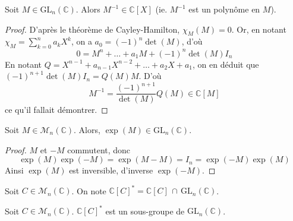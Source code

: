 





  \begin{lemma}
    \label{surjectivite-de-l-exponentielle-1}
    Soit $M \in \mathrm{GL}_n(\mathbb{C})$. Alors $M^{-1} \in \mathbb{C}[X]$ (ie. $M^{-1}$ est un polynôme en $M$).
  \end{lemma}

  \begin{proof}
    D'après le théorème de Cayley-Hamilton, $\chi_M(M) = 0$. Or, en notant $\chi_M = \sum_{k=0}^n a_k X^k$, on a $a_0 = (-1)^n \det(M)$, d'où
    \[ 0 = M^n + \dots + a_1 M + (-1)^n \det(M) I_n \]
    En notant $Q = X^{n-1} + a_{n-1}X^{n-2} + \dots + a_2 X + a_1$, on en déduit que $(-1)^{n+1} \det(M) I_n = Q(M)M$. D'où
    \[ M^{-1} = \frac{(-1)^{n+1}}{\det(M)} Q(M) \in \mathbb{C}[M] \]
    ce qu'il fallait démontrer.
  \end{proof}

  \begin{lemma}
    \label{surjectivite-de-l-exponentielle-2}
    Soit $M \in \mathcal{M}_n(\mathbb{C})$. Alors, $\exp(M) \in \mathrm{GL}_n(\mathbb{C})$.
  \end{lemma}

  \begin{proof}
    $M$ et $-M$ commutent, donc
    \[ \exp(M)\exp(-M) = \exp(M-M) = I_n = \exp(-M)\exp(M) \]
    Ainsi $\exp(M)$ est inversible, d'inverse $\exp(-M)$.
  \end{proof}

    \begin{notation}
    Soit $C \in \mathcal{M}_n(\mathbb{C})$. On note $\mathbb{C}[C]^* = \mathbb{C}[C] \, \cap \, \mathrm{GL}_n(\mathbb{C})$.
  \end{notation}

  \begin{lemma}
    \label{surjectivite-de-l-exponentielle-3}
    Soit $C \in \mathcal{M}_n(\mathbb{C})$. $\mathbb{C}[C]^*$ est un sous-groupe de $\mathrm{GL}_n(\mathbb{C})$.
  \end{lemma}


